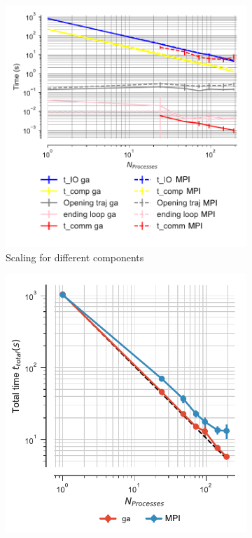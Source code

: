 \begin{figure}[!htb]
  \centering
  \begin{subfigure}{.32\textwidth}
    \includegraphics[width=\linewidth]{figures/Comparison_IO_compute_scaling_traj_splitting_edited.pdf}
    \captionsetup{format=hang}
    \caption{Scaling for different components}
    \label{fig:ScalingComputeIO-split}
  \end{subfigure}
  \hfill
  \begin{subfigure}{.3\textwidth}
    \includegraphics[width=\linewidth]{figures/Comparison_tot_time_traj_splitting_edited.pdf}

\end{subfigure}
\end{figure}
